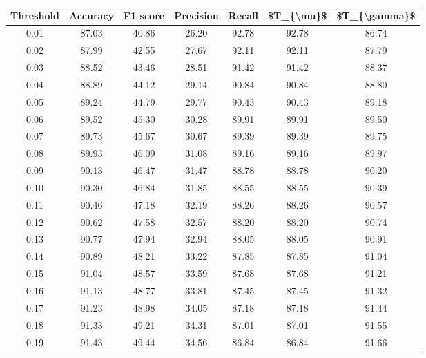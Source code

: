 \begin{tabular}{|c|c|c|c|c|c|c|}
\hline
 Threshold &  Accuracy &  F1 score &  Precision &  Recall &  \$T\_\{\textbackslash mu\}\$ &  \$T\_\{\textbackslash gamma\}\$ \\
\hline
      0.01 &     87.03 &     40.86 &      26.20 &   92.78 &      92.78 &         86.74 \\
      0.02 &     87.99 &     42.55 &      27.67 &   92.11 &      92.11 &         87.79 \\
      0.03 &     88.52 &     43.46 &      28.51 &   91.42 &      91.42 &         88.37 \\
      0.04 &     88.89 &     44.12 &      29.14 &   90.84 &      90.84 &         88.80 \\
      0.05 &     89.24 &     44.79 &      29.77 &   90.43 &      90.43 &         89.18 \\
      0.06 &     89.52 &     45.30 &      30.28 &   89.91 &      89.91 &         89.50 \\
      0.07 &     89.73 &     45.67 &      30.67 &   89.39 &      89.39 &         89.75 \\
      0.08 &     89.93 &     46.09 &      31.08 &   89.16 &      89.16 &         89.97 \\
      0.09 &     90.13 &     46.47 &      31.47 &   88.78 &      88.78 &         90.20 \\
      0.10 &     90.30 &     46.84 &      31.85 &   88.55 &      88.55 &         90.39 \\
      0.11 &     90.46 &     47.18 &      32.19 &   88.26 &      88.26 &         90.57 \\
      0.12 &     90.62 &     47.58 &      32.57 &   88.20 &      88.20 &         90.74 \\
      0.13 &     90.77 &     47.94 &      32.94 &   88.05 &      88.05 &         90.91 \\
      0.14 &     90.89 &     48.21 &      33.22 &   87.85 &      87.85 &         91.04 \\
      0.15 &     91.04 &     48.57 &      33.59 &   87.68 &      87.68 &         91.21 \\
      0.16 &     91.13 &     48.77 &      33.81 &   87.45 &      87.45 &         91.32 \\
      0.17 &     91.23 &     48.98 &      34.05 &   87.18 &      87.18 &         91.44 \\
      0.18 &     91.33 &     49.21 &      34.31 &   87.01 &      87.01 &         91.55 \\
      0.19 &     91.43 &     49.44 &      34.56 &   86.84 &      86.84 &         91.66 \\

\end{tabular}
